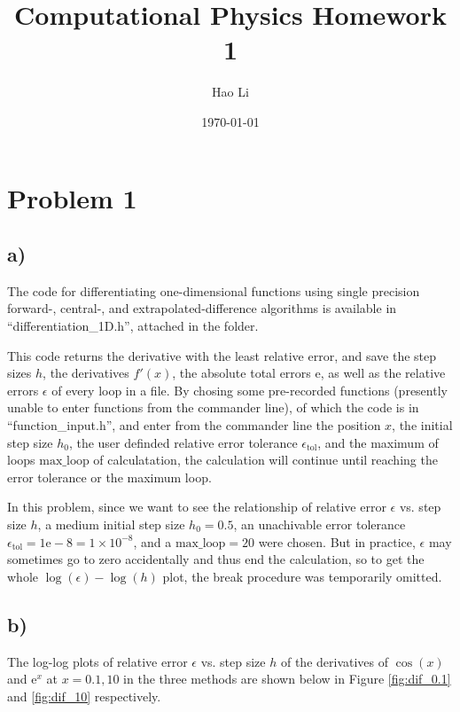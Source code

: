 \documentclass[12pt, graphicx]{article}
\begin{document}
\title{Computational Physics Homework 1}
\author{Hao Li\footnotemark[2]}
\date{\today}


\maketitle

\section*{Problem 1}
\subsection*{a)}
The code for differentiating one-dimensional functions using single precision forward-, central-, and extrapolated-difference algorithms is available in \textquotedblleft differentiation\_1D.h\textquotedblright, attached in the folder.\par

This code returns the derivative with the least relative error, and save the step sizes $h$, the derivatives $f'(x)$, the absolute total errors $\mathrm{e}$, as well as the relative errors $\epsilon$ of every loop in a file. By chosing some pre-recorded functions (presently unable to enter functions from the commander line), of which the code is in \textquotedblleft function\_input.h\textquotedblright, and enter from the commander line the position $x$, the initial step size $h_0$, the user definded relative error tolerance $\epsilon_\mathrm{tol}$, and the maximum of loops $\mathrm{max\_loop}$ of calculatation, the calculation will continue until reaching the error tolerance or the maximum loop. \par

In this problem, since we want to see the relationship of relative error $\epsilon$ vs. step size $h$, a medium initial step size $h_0=0.5$, an unachivable error tolerance $\epsilon_\mathrm{tol}=1\mathrm{e}-8=1\times10^{-8}$, and a $\mathrm{max\_loop}=20$ were chosen. But in practice, $\epsilon$ may sometimes go to zero accidentally and thus end the calculation, so to get the whole $\log(\epsilon)-\log(h)$ plot, the break procedure was temporarily omitted.

\subsection*{b)}
The log-log plots of relative error $\epsilon$ vs. step size $h$ of the derivatives of $\cos(x)$ and $\mathrm{e}^x$ at $x=0.1,10$ in the three methods are shown below in Figure \ref{fig:dif_0.1} and \ref{fig:dif_10} respectively.
\end{document}
